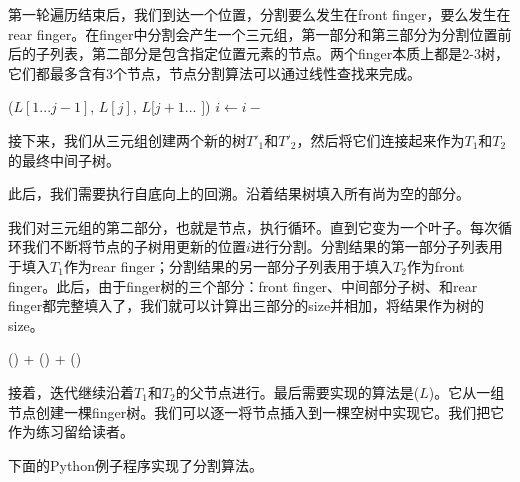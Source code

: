\documentclass[UTF8]{article}
\begin{document}
第一轮遍历结束后，我们到达一个位置，分割要么发生在front finger，要么发生在rear finger。在finger中分割会产生一个三元组，第一部分和第三部分为分割位置前后的子列表，第二部分是包含指定位置元素的节点。两个finger本质上都是2-3树，它们都最多含有3个节点，节点分割算法可以通过线性查找来完成。

\begin{algorithmic}
      \State \Return ($L[1...j-1]$, $L[j]$, $L[j+1...$  $]$)
    \EndIf
    \State $i \gets i -$ 
  \EndFor
\EndFunction
\end{algorithmic}

接下来，我们从三元组创建两个新的树$T'_1$和$T'_2$，然后将它们连接起来作为$T_1$和$T_2$的最终中间子树。

此后，我们需要执行自底向上的回溯。沿着结果树填入所有尚为空的部分。

我们对三元组的第二部分，也就是节点，执行循环。直到它变为一个叶子。每次循环我们不断将节点的子树用更新的位置$i$进行分割。分割结果的第一部分子列表用于填入$T_1$作为rear finger；分割结果的另一部分子列表用于填入$T_2$作为front finger。此后，由于finger树的三个部分：front finger、中间部分子树、和rear finger都完整填入了，我们就可以计算出三部分的size并相加，将结果作为树的size。

\begin{algorithmic}
  \State \Return {}() + () + ()
\EndFunction
\end{algorithmic}

接着，迭代继续沿着$T_1$和$T_2$的父节点进行。最后需要实现的算法是($L$)。它从一组节点创建一棵finger树。我们可以逐一将节点插入到一棵空树中实现它。我们把它作为练习留给读者。

下面的Python例子程序实现了分割算法。
\end{document}
